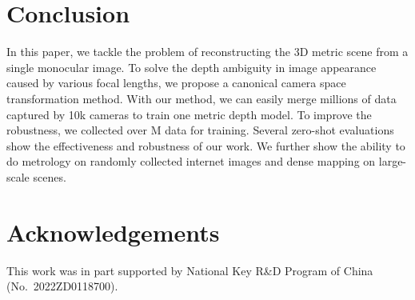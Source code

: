 \section{Conclusion} In this paper, we 
tackle 
the problem of reconstructing the 3D metric scene from a single monocular image. To solve the depth ambiguity in image appearance caused by various focal lengths, we propose a canonical camera space transformation method. With our method, we can easily merge millions of data captured by 10k cameras to train one metric depth model. To improve the robustness, we collected over M data for training. Several zero-shot evaluations show the effectiveness and robustness of our work. We further show the ability to do metrology on randomly collected internet images and dense mapping on large-scale scenes. 

\section*{Acknowledgements}

This work was in part supported by National Key R\&D Program of China (No.\  2022ZD0118700).










